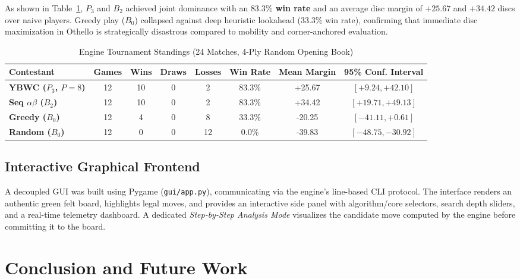 \documentclass[11pt,a4paper]{article}
\begin{document}
As shown in Table~\ref{tab:tournament}, $P_3$ and $B_2$ achieved joint dominance with an \textbf{$83.3\%$ win rate} and an average disc margin of $+25.67$ and $+34.42$ discs over naive players. Greedy play ($B_0$) collapsed against deep heuristic lookahead ($33.3\%$ win rate), confirming that immediate disc maximization in Othello is strategically disastrous compared to mobility and corner-anchored evaluation.

\begin{table}[htbp]
  \centering
  \caption{Engine Tournament Standings (24 Matches, 4-Ply Random Opening Book)}
  \label{tab:tournament}
  \begin{tabular}{l c c c c c c c}
    \toprule
    \textbf{Contestant} & \textbf{Games} & \textbf{Wins} & \textbf{Draws} & \textbf{Losses} & \textbf{Win Rate} & \textbf{Mean Margin} & \textbf{95\% Conf. Interval} \\
    \midrule
    \textbf{YBWC ($P_3$, $P=8$)} & 12 & 10 & 0 & 2 & 83.3\% & +25.67 & $[+9.24, +42.10]$ \\
    \textbf{Seq $\alpha\beta$ ($B_2$)} & 12 & 10 & 0 & 2 & 83.3\% & +34.42 & $[+19.71, +49.13]$ \\
    \textbf{Greedy ($B_0$)}        & 12 & 4  & 0 & 8 & 33.3\% & -20.25 & $[-41.11, +0.61]$ \\
    \textbf{Random ($B_0$)}        & 12 & 0  & 0 & 12 & 0.0\%  & -39.83 & $[-48.75, -30.92]$ \\
    \bottomrule
  \end{tabular}
\end{table}

\subsection{Interactive Graphical Frontend}
A decoupled GUI was built using Pygame (\texttt{gui/app.py}), communicating via the engine's line-based CLI protocol. The interface renders an authentic green felt board, highlights legal moves, and provides an interactive side panel with algorithm/core selectors, search depth sliders, and a real-time telemetry dashboard. A dedicated \textit{Step-by-Step Analysis Mode} visualizes the candidate move computed by the engine before committing it to the board.

\section{Conclusion and Future Work}
\label{sec:conclusion}
\end{document}
